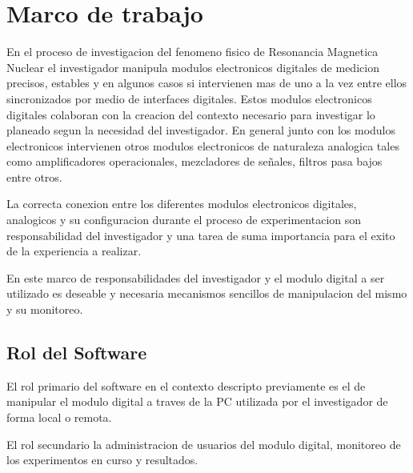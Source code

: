 \section{Marco de trabajo}

En el proceso de investigacion del fenomeno fisico de Resonancia Magnetica Nuclear el investigador manipula modulos 
electronicos digitales de medicion precisos, estables y en algunos casos si intervienen mas de uno a la vez entre ellos sincronizados 
por medio de interfaces digitales. Estos modulos electronicos digitales colaboran con la creacion del contexto necesario para investigar lo planeado 
segun la necesidad del investigador. En general junto con los modulos electronicos intervienen otros modulos electronicos de naturaleza analogica
tales como amplificadores operacionales, mezcladores de señales, filtros pasa bajos entre otros.

La correcta conexion entre los diferentes modulos electronicos digitales, analogicos y su configuracion durante el proceso de experimentacion
son responsabilidad del investigador y una tarea de suma importancia para el exito de la experiencia a realizar.

En este marco de responsabilidades del investigador y el modulo digital a ser utilizado es deseable y necesaria mecanismos sencillos de manipulacion
del mismo y su monitoreo.

\subsection{Rol del Software}

El rol primario del software en el contexto descripto previamente es el de manipular el modulo digital a traves de la PC utilizada por el investigador 
de forma local o remota.

El rol secundario la administracion de usuarios del modulo digital, monitoreo de los experimentos en curso y resultados.

\newpage

